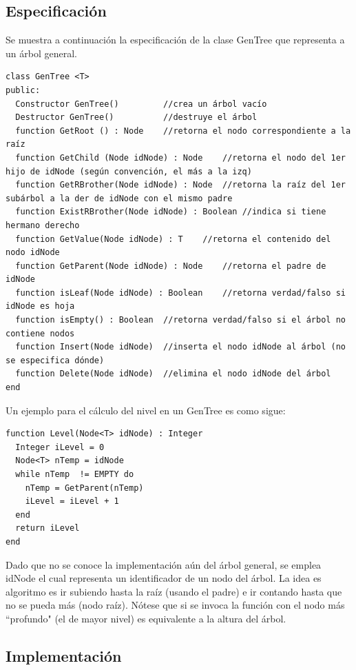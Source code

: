 \subsection{Especificación}

Se muestra a continuación la especificación de la clase GenTree que representa a un árbol general.

\begin{lstlisting}[upquote=true, language=pseudo]
class GenTree <T>
public:
  Constructor GenTree()			//crea un árbol vacío
  Destructor GenTree()			//destruye el árbol 
  function GetRoot () : Node	//retorna el nodo correspondiente a la raíz
  function GetChild (Node idNode) : Node	//retorna el nodo del 1er hijo de idNode (según convención, el más a la izq)
  function GetRBrother(Node idNode) : Node	//retorna la raíz del 1er subárbol a la der de idNode con el mismo padre
  function ExistRBrother(Node idNode) : Boolean	//indica si tiene hermano derecho
  function GetValue(Node idNode) : T	//retorna el contenido del nodo idNode
  function GetParent(Node idNode) : Node	//retorna el padre de idNode
  function isLeaf(Node idNode) : Boolean	//retorna verdad/falso si idNode es hoja
  function isEmpty() : Boolean	//retorna verdad/falso si el árbol no contiene nodos
  function Insert(Node idNode)	//inserta el nodo idNode al árbol (no se especifica dónde)
  function Delete(Node idNode)	//elimina el nodo idNode del árbol
end
\end{lstlisting}

Un ejemplo para el cálculo del nivel en un GenTree es como sigue:

\begin{lstlisting}[upquote=true, language=pseudo]
function Level(Node<T> idNode) : Integer
  Integer iLevel = 0
  Node<T> nTemp = idNode
  while nTemp  != EMPTY do
    nTemp = GetParent(nTemp)
    iLevel = iLevel + 1
  end
  return iLevel
end
\end{lstlisting}

Dado que no se conoce la implementación aún del árbol general, se emplea idNode el cual representa un identificador de un nodo del árbol. La idea es algoritmo es ir subiendo hasta la raíz (usando el padre) e ir contando hasta que no se pueda más (nodo raíz). Nótese que si se invoca la función con el nodo más ``profundo" (el de mayor nivel) es equivalente a la altura del árbol.

\subsection{Implementación}

